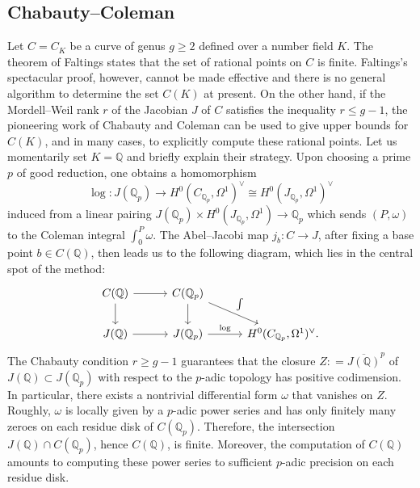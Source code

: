 \documentclass[11pt,oneside]{amsart}
\theoremstyle{plain}
\theoremstyle{definition}
\def\lra{{\longrightarrow}}
\def\Q{\mathbb{Q}}
\def\ra{\rightarrow}
\begin{document}
\subsection{Chabauty--Coleman}\label{ss:CC_method}
Let $C = C_K$ be a curve of genus $g \ge 2$ defined over a number field $K$. The theorem of Faltings states that the set of rational points on $C$ is finite. Faltings's spectacular proof, however, cannot be made effective and there is no general algorithm to determine the set $C(K)$ at present. On the other hand, if the Mordell--Weil rank $r$ of the Jacobian $J$  of $C$ satisfies the inequality  
$r \le g -1$,  the pioneering work of Chabauty and Coleman  \cite{chab41, coleman}  can be used to give upper bounds for $C(K)$, and in many cases, to explicitly compute these rational points. 
Let us momentarily set $K = \Q$ and briefly explain their strategy. Upon choosing a prime $p$ of good reduction, one obtains a homomorphism 
$$\log: J (\Q_p) \lra H^0 (C_{\Q_p}, \Omega^1)^{\vee} \cong H^0 (J_{\Q_p}, \Omega^1)^{\vee} $$
induced from a linear pairing 
$J(\Q_p) \times H^0 (J_{\Q_p}, \Omega^1) \longrightarrow \Q_p$ which sends $(P, \omega)$ to the Coleman integral $\int_{0}^P \omega$. The Abel--Jacobi map $j_b: C \ra J$, after fixing a base point $b \in C(\Q)$, then leads us to the following diagram, which lies in the central spot of the method: 
\[
\begin{tikzcd}[column sep = 3em] 
C(\Q) \arrow[r] \arrow[d] & C(\Q_p)  \arrow[d] \arrow[rd, "\int"] \\
J(\Q) \arrow[r] & J (\Q_p)   \arrow[r, "\log"] & H^0 (C_{\Q_p}, \Omega^1)^{\vee}.
\end{tikzcd}
\]
The Chabauty condition $r \ge g - 1$ guarantees that the closure $Z : = \overline{J(\Q)}^p$ of $J(\Q) \subset J (\Q_p)$ with respect to the $p$-adic topology has positive codimension. In particular, there exists a nontrivial differential form $\omega$ that vanishes on $Z$. Roughly, $\omega$ is locally given by a $p$-adic power series and has only finitely many zeroes on each residue disk of $C(\Q_p)$. Therefore, the intersection $J(\Q) \cap C(\Q_p)$, hence $C(\Q)$, is finite. Moreover, the computation of $C(\Q)$ amounts to computing these power series to sufficient $p$-adic precision on each residue disk.  
\end{document}
